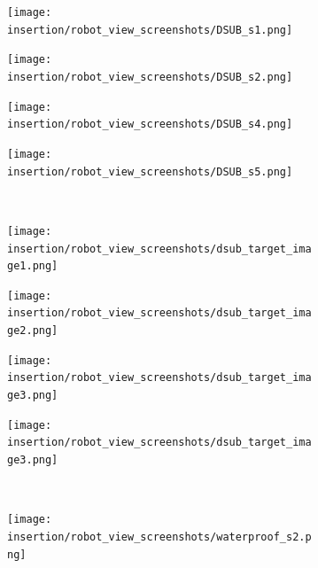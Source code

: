 \begin{figure}[thb]
\begin{subfigure}[b]{0.20\linewidth}
        \texttt{[image: insertion/robot\_view\_screenshots/DSUB\_s1.png]}\\
        \centering
    \end{subfigure} \hfill
    \begin{subfigure}[b]{0.20\linewidth}
        \texttt{[image: insertion/robot\_view\_screenshots/DSUB\_s2.png]}\\
        \centering
    \end{subfigure}     \hfill
    \begin{subfigure}[b]{0.20\linewidth}
        \texttt{[image: insertion/robot\_view\_screenshots/DSUB\_s4.png]}\\
        \centering
    \end{subfigure}  \hfill
    \begin{subfigure}[b]{0.20\linewidth}
        \texttt{[image: insertion/robot\_view\_screenshots/DSUB\_s5.png]}\\
        \centering
    \end{subfigure}    
    \\
    \vspace{10pt}
    \begin{subfigure}[b]{0.20\linewidth}
        \texttt{[image: insertion/robot\_view\_screenshots/dsub\_target\_image1.png]}\\
        \centering
    \end{subfigure} \hfill
    \begin{subfigure}[b]{0.20\linewidth}
        \texttt{[image: insertion/robot\_view\_screenshots/dsub\_target\_image2.png]}\\
        \centering
    \end{subfigure}     \hfill
    \begin{subfigure}[b]{0.20\linewidth}
        \texttt{[image: insertion/robot\_view\_screenshots/dsub\_target\_image3.png]}\\
        \centering
    \end{subfigure}  \hfill
    \begin{subfigure}[b]{0.20\linewidth}
        \texttt{[image: insertion/robot\_view\_screenshots/dsub\_target\_image3.png]}\\
        \centering
    \end{subfigure}    
    \\
    \vspace{10pt}
    \begin{subfigure}[b]{0.20\linewidth}
        \texttt{[image: insertion/robot\_view\_screenshots/waterproof\_s2.png]}\\

\end{subfigure}
\end{figure}
